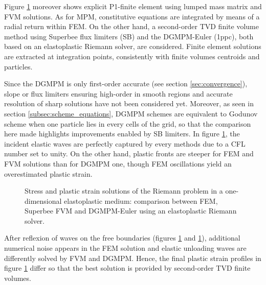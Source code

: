 Figure \ref{fig:RP_EP_dgmpm_fvm} moreover shows explicit P1-finite element using lumped mass matrix and FVM solutions. As for MPM, constitutive equations are integrated by means of a radial return within FEM. 
On the other hand, a second-order TVD finite volume method using Superbee flux limiters (SB) \cite{Thomas_EP} and the DGMPM-Euler (1ppc), both based on an elastoplastic Riemann solver, are considered.
Finite element solutions are extracted at integration points, consistently with finite volumes centroids and particles.

Since the DGMPM is only first-order accurate (see section \ref{sec:convergence}), slope or flux limiters \cite{vanLeer_Limiters} ensuring high-order in smooth regions and accurate resolution of sharp solutions have not been considered yet. Moreover, as seen in section \ref{subsec:scheme_equations}, DGMPM schemes are equivalent to Godunov scheme when one particle lies in every cells of the grid, so that the comparison here made highlights improvements enabled by SB limiters. In figure \ref{fig:RP_EP_dgmpm_fvm}, the incident elastic waves are perfectly captured by every methods due to a CFL number set to unity. On the other hand, plastic fronts are steeper for FEM and FVM solutions than for DGMPM one, though FEM oscillations yield an overestimated plastic strain. 
\begin{figure}[h!]
  \centering
  { \label{subfig:ep_dgmpm_fvm1}}
  { \label{subfig:ep_dgmpm_fvm2}}
  { \label{subfig:ep_dgmpm_fvm3}}
  {}
  \caption{Stress and plastic strain solutions of the Riemann problem in a one-dimensional elastoplastic medium: comparison between FEM, Superbee FVM and DGMPM-Euler using an elastoplastic Riemann solver.}
  \label{fig:RP_EP_dgmpm_fvm}
\end{figure}
After reflexion of waves on the free boundaries (figures \ref{fig:RP_EP_dgmpm_fvm} and \ref{fig:RP_EP_dgmpm_fvm}), additional numerical noise appears in the FEM solution and elastic unloading waves are differently solved by FVM and DGMPM. Hence, the final plastic strain profiles in figure \ref{fig:RP_EP_dgmpm_fvm} differ so that the best solution is provided by second-order TVD finite volumes.

